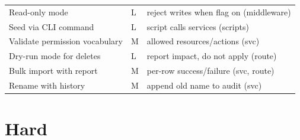 \documentclass[11pt,a4paper]{report}
\begin{document}
\begin{longtable}{p{} p{} p{}}
Read-only mode & L & reject writes when flag on (middleware) \\
Seed via CLI command & L & script calls services (scripts) \\
Validate permission vocabulary & M & allowed resources/actions (svc) \\
Dry-run mode for deletes & L & report impact, do not apply (route) \\
Bulk import with report & M & per-row success/failure (svc, route) \\
Rename with history & M & append old name to audit (svc) \\
\end{longtable}

\section{Hard}
\end{document}
